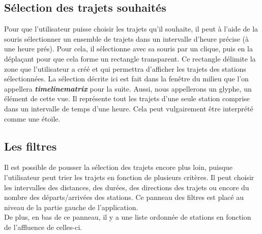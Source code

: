 \documentclass[12pt]{article}
\begin{document}
		\subsection{Sélection des trajets souhaités}
		Pour que l'utilisateur puisse choisir les trajets qu'il souhaite, il peut à l'aide de la
		souris sélectionner un ensemble de trajets dans un intervalle d'heure précise (à une
		heure prés). Pour cela, il sélectionne avec sa souris par un clique, puis en la 
		déplaçant pour que cela forme un rectangle transparent. Ce rectangle délimite la zone
		que l'utilisateur a créé et qui permettra d'afficher les trajets des stations
		sélectionnées. La sélection décrite ici est fait dans la fenêtre du milieu que l'on
		appellera \textbf{\textit{timelinematrix}} pour la suite. Aussi, nous appellerons
		un glyphe, un élément de cette vue. Il représente tout les trajets d'une seule station
		comprise dans un intervalle de temps d'une heure. Cela peut vulgairement être interprété
		comme une étoile.
		
		\subsection{Les filtres}
		Il est possible de pousser la sélection des trajets encore plus loin, puisque l'utilisateur
		peut trier les trajets en fonction de plusieurs critères. Il peut choisir les intervalles
		des distances, des durées, des directions des trajets ou encore du nombre des
		départs/arrivées des stations. Ce panneau des filtres est placé au niveau de la partie gauche
		de l'application.\\
		De plus, en bas de ce panneau, il y a une liste ordonnée de stations en fonction
		de l'affluence de celles-ci.
	
\newpage
\end{document}
